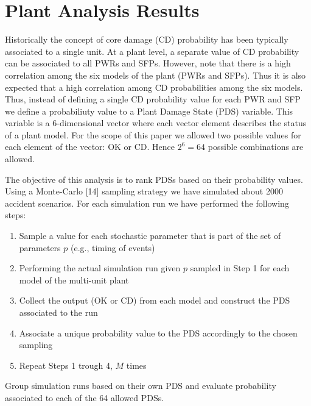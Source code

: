 \section{Plant Analysis Results}
\label{sec:plantAnalysisResults}

Historically the concept of core damage (CD) probability has been typically associated to a single unit. 
At a plant level, a separate value of CD probability can be associated to all PWRs and SFPs. 
However, note that there is a high correlation among the six models of the plant (PWRs and SFPs). 
Thus it is also expected that a high correlation among CD probabilities among the six models.
Thus, instead of defining a single CD probability value for each PWR and SFP we define a probabiliuty 
value to a Plant Damage State (PDS) variable. This variable is a $6$-dimensional vector where each vector 
element describes the status of a plant model. For the scope of this paper we allowed two possible values 
for each element of the vector: OK or CD. Hence $2^6=64$ possible combinations are allowed.

The objective of this analysis is to rank PDSs based on their probability values.
Using a Monte-Carlo [14] sampling strategy we have simulated about 2000 accident scenarios. 
For each simulation run we have performed the following steps:
\begin{enumerate}
  \item Sample a value for each stochastic parameter that is part of the set of parameters $p$ (e.g., timing of events)
  \item Performing the actual simulation run given $p$ sampled in Step 1 for each model of the multi-unit plant
  \item Collect the output (OK or CD) from each model and construct the PDS associated to the run
  \item Associate a unique probability value to the PDS accordingly to the chosen sampling
  \item Repeat Steps 1 trough 4, $M$ times 
\end{enumerate}
Group simulation runs based on their own PDS and evaluate probability associated to each of the 64 allowed PDSs.
